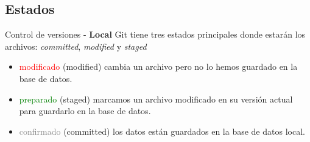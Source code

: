 \documentclass{beamer}
\begin{document}
\subsection{Estados}
\begin{frame}{Control de versiones - \textbf{Local}}
Git tiene tres estados principales donde estarán los archivos: \textit{committed}, \textit{modified} y \textit{staged} \\

\begin{itemize}
\item \textcolor{red}{modificado} (modified) cambia un archivo pero no lo hemos guardado en la base de datos.
\item \textcolor{green}{preparado} (staged) marcamos un archivo modificado en su versión actual para guardarlo en la base de datos.
\item \textcolor{gray}{confirmado}  (committed) los datos están guardados en la base de datos local.
\end{itemize}
\end{frame}
\end{document}
